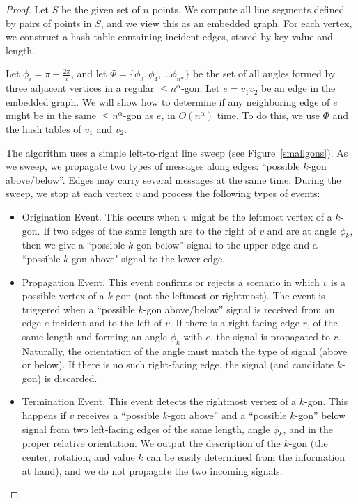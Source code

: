 \documentclass{article}
\begin{document}
\begin{proof}
Let $S$ be the given set of $n$ points.
We compute all line segments defined by pairs of points in $S$, and we
view this as an embedded graph. 
For each vertex, we construct a hash table 
containing incident edges, stored by key value and length.




Let $\phi_i = \pi-\frac{2 \pi}{i}$, and let $\Phi= \{ \phi_3, \phi_4, \ldots
\phi_{n^{\alpha}} \}$ be the set of all
angles formed by three adjacent vertices in a regular ${\leq}n^{\alpha}$-gon. 
Let $e{=}v_1v_2$ be an edge in the embedded graph.
We will show how to determine if any neighboring edge of $e$ might be
in the same ${\leq} n^{\alpha}$-gon as $e$, in  $O(n^{\alpha})$ time.
To do this, we use $\Phi$ and the hash tables of $v_1$ and $v_2$. 


The algorithm uses a simple left-to-right line sweep (see Figure~\ref{smallgons}). As we sweep, 
we propagate two types of messages along edges: ``possible
$k$-gon above/below''.
Edges may carry several messages at the same time.
During the sweep, we stop at each vertex $v$ and 
process the following types of events:

\begin{itemize}
\item {Origination Event.} This occurs when $v$ might be the leftmost
vertex of a $k$-gon. If two edges of the same length are to the right of
$v$ and are at angle $\phi_{k}$, then we give a ``possible $k$-gon
below'' signal to the upper edge and a ``possible $k$-gon above" signal to the
lower edge. 

\item {Propagation Event.}
This event confirms or rejects a scenario in which $v$ is a possible vertex of a
$k$-gon (not the leftmost or rightmost).
The event is triggered when a ``possible $k$-gon above/below'' signal is
received from an edge $e$ incident and to the left of $v$.
If there is a right-facing edge $r$, of the
same length and forming an angle $\phi_k$ with $e$, 
the signal is propagated to $r$.  Naturally, the
orientation of the angle must match the type of signal (above or below). 
If there is no such right-facing edge, the
signal (and candidate $k$-gon) is discarded.

\item {Termination Event.} This event detects the rightmost
vertex of a $k$-gon. This happens if $v$ receives a
``possible $k$-gon above'' and a ``possible $k$-gon'' below signal
from two left-facing edges of the same length, angle $\phi_k$, and
in the proper relative orientation.
We output the description of the $k$-gon (the center, rotation, and value $k$ can
be easily determined from the information at hand), and we do not propagate
the two incoming signals.
\end{itemize}



\end{proof}
\end{document}
